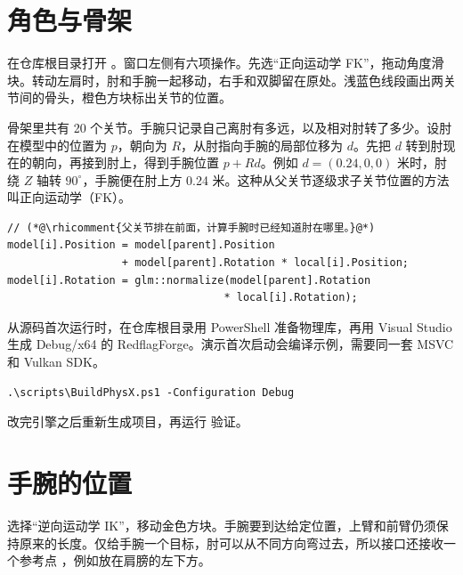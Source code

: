 \clearpage


\clearpage
\section{角色与骨架}
在仓库根目录打开 。窗口左侧有六项操作。先选“正向运动学 FK”，拖动角度滑块。转动左肩时，肘和手腕一起移动，右手和双脚留在原处。浅蓝色线段画出两关节间的骨头，橙色方块标出关节的位置。


骨架里共有 20 个关节。手腕只记录自己离肘有多远，以及相对肘转了多少。设肘在模型中的位置为 $p$，朝向为 $R$，从肘指向手腕的局部位移为 $d$。先把 $d$ 转到肘现在的朝向，再接到肘上，得到手腕位置 $p+Rd$。例如 $d=(0.24,0,0)$ 米时，肘绕 $Z$ 轴转 $90^\circ$，手腕便在肘上方 0.24 米。这种从父关节逐级求子关节位置的方法叫正向运动学（FK）。

\begin{lstlisting}[style=besidetext]
// (*@\rhicomment{父关节排在前面，计算手腕时已经知道肘在哪里。}@*)
model[i].Position = model[parent].Position
                  + model[parent].Rotation * local[i].Position;
model[i].Rotation = glm::normalize(model[parent].Rotation
                                  * local[i].Rotation);
\end{lstlisting}

从源码首次运行时，在仓库根目录用 PowerShell 准备物理库，再用 Visual Studio 生成 Debug/x64 的 RedflagForge。演示首次启动会编译示例，需要同一套 MSVC 和 Vulkan SDK。
\begin{lstlisting}[style=besidetext]
.\scripts\BuildPhysX.ps1 -Configuration Debug
\end{lstlisting}
改完引擎之后重新生成项目，再运行  验证。

\clearpage
\section{手腕的位置}
选择“逆向运动学 IK”，移动金色方块。手腕要到达给定位置，上臂和前臂仍须保持原来的长度。仅给手腕一个目标，肘可以从不同方向弯过去，所以接口还接收一个参考点 ，例如放在肩膀的左下方。

